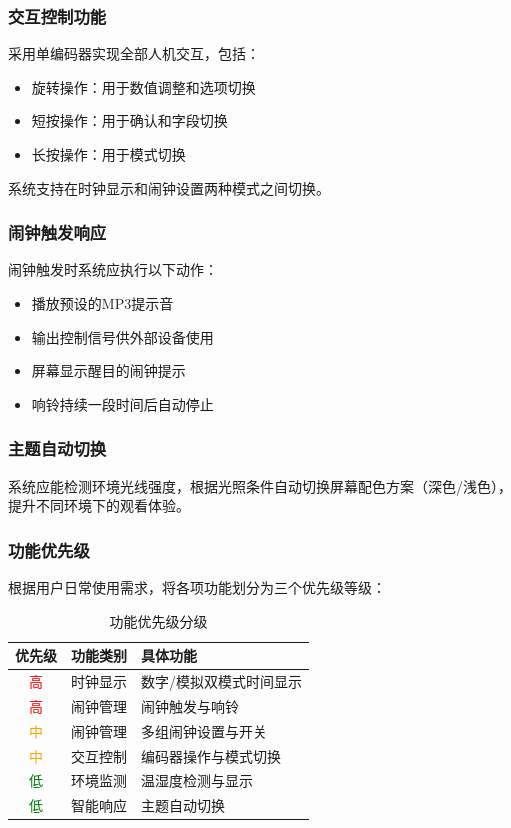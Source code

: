 \documentclass[12pt,a4paper]{article}
\begin{document}
\subsubsection*{交互控制功能}

采用单编码器实现全部人机交互，包括：
\begin{itemize}
    \item 旋转操作：用于数值调整和选项切换
    \item 短按操作：用于确认和字段切换
    \item 长按操作：用于模式切换
\end{itemize}
系统支持在时钟显示和闹钟设置两种模式之间切换。

\subsubsection*{闹钟触发响应}
闹钟触发时系统应执行以下动作：
\begin{itemize}
    \item 播放预设的MP3提示音
    \item 输出控制信号供外部设备使用
    \item 屏幕显示醒目的闹钟提示
    \item 响铃持续一段时间后自动停止
\end{itemize}

\subsubsection*{主题自动切换}
系统应能检测环境光线强度，根据光照条件自动切换屏幕配色方案（深色/浅色），提升不同环境下的观看体验。



\subsubsection*{功能优先级}

根据用户日常使用需求，将各项功能划分为三个优先级等级：

\begin{table}[H]
\centering
\begin{tabular}{|c|c|l|}
\hline
\textbf{优先级} & \textbf{功能类别} & \textbf{具体功能} \\
\hline
\textcolor{red}{高} & 时钟显示 & 数字/模拟双模式时间显示 \\
\hline
\textcolor{red}{高} & 闹钟管理 & 闹钟触发与响铃 \\
\hline
\textcolor{orange}{中} & 闹钟管理 & 多组闹钟设置与开关 \\
\hline
\textcolor{orange}{中} & 交互控制 & 编码器操作与模式切换 \\
\hline
\textcolor{green}{低} & 环境监测 & 温湿度检测与显示 \\
\hline
\textcolor{green}{低} & 智能响应 & 主题自动切换 \\
\hline
\end{tabular}
\caption{功能优先级分级}
\end{table}
\end{document}
